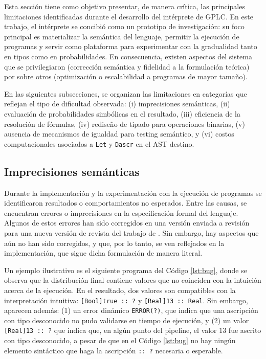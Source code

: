 Esta sección tiene como objetivo presentar, de manera crítica, las
principales limitaciones identificadas durante el desarrollo del
intérprete de GPLC. En este trabajo, el intérprete se concibió como un
prototipo de investigación: su foco principal es materializar la
semántica del lenguaje, permitir la ejecución de programas y servir
como plataforma para experimentar con la gradualidad tanto en tipos
como en probabilidades. En consecuencia, existen aspectos del sistema
que se privilegiaron (corrección semántica y fidelidad a la
formulación teórica) por sobre otros (optimización o escalabilidad a
programas de mayor tamaño).


En las siguientes subsecciones, se organizan las limitaciones en
categorías que reflejan el tipo de dificultad observada: {(i)}
imprecisiones semánticas, {(ii)} evaluación de probabilidades
simbólicas en el resultado, {(iii)} eficiencia de la resolución de
fórmulas, {(iv)} rediseño de tipado para operaciones binarias,
{(v)} ausencia de mecanismos de igualdad para testing
semántico, y {(vi)} costos computacionales asociados a
\lstinline|Let| y \lstinline|Dascr| en el AST destino.


\subsection{Imprecisiones semánticas}

Durante la implementación y la experimentación con la ejecución de
programas se identificaron resultados o comportamientos no
esperados. Entre las causas, se encuentran errores o imprecisiones en
la especificación formal del lenguaje. Algunos de estos errores han
sido corregidos en una versión enviada a revisión para una nueva
versión de revista del trabajo de \citet{gplc}. Sin embargo, hay
aspectos que aún no han sido corregidos, y que, por lo tanto, se ven
reflejados en la implementación, que sigue dicha formulación de manera
literal.

Un ejemplo ilustrativo es el siguiente programa del Código
\ref{lst:bug}, donde se observa que la distribución final contiene
valores que no coinciden con la intuición acerca de la
ejecución. En el resultado, dos valores son compatibles con la
interpretación intuitiva: \lstinline|[Bool]true :: ?| y
\lstinline|[Real]13 :: Real|.  Sin embargo, aparecen además:
{(1)} un error dinámico \lstinline|ERROR(?)|, que indica que una
ascripción con tipo desconocido no pudo validarse en tiempo de
ejecución, y {(2)} un valor \lstinline|[Real]13 :: ?| que
indica que, en algún punto del pipeline, el valor $13$ fue ascrito con
tipo desconocido, a pesar de que en el Código \ref{lst:bug} no hay
ningún elemento sintáctico que haga la ascripción \lstinline|:: ?|
necesaria o esperable.

